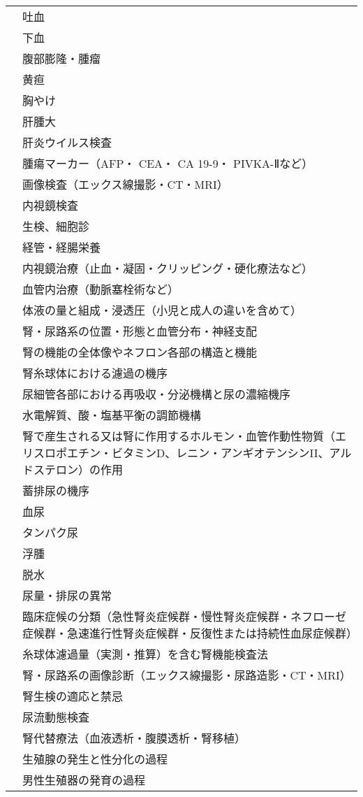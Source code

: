 \begin{xltabular}{\linewidth}{XX}
 & 吐血 \\
 & 下血 \\
 & 腹部膨隆・腫瘤 \\
 & 黄疸 \\
 & 胸やけ \\
 & 肝腫大 \\
 & 肝炎ウイルス検査 \\
 & 腫瘍マーカー（AFP・ CEA・ CA 19-9・ PIVKA-Ⅱなど） \\
 & 画像検査（エックス線撮影・CT・MRI） \\
 & 内視鏡検査 \\
 & 生検、細胞診 \\
 & 経管・経腸栄養 \\
 & 内視鏡治療（止血・凝固・クリッピング・硬化療法など） \\
 & 血管内治療（動脈塞栓術など） \\
 & 体液の量と組成・浸透圧（小児と成人の違いを含めて） \\
 & 腎・尿路系の位置・形態と血管分布・神経支配 \\
 & 腎の機能の全体像やネフロン各部の構造と機能 \\
 & 腎糸球体における濾過の機序 \\
 & 尿細管各部における再吸収・分泌機構と尿の濃縮機序 \\
 & 水電解質、酸・塩基平衡の調節機構 \\
 & 腎で産生される又は腎に作用するホルモン・血管作動性物質（エリスロポエチン・ビタミンD、レニン・アンギオテンシンII、アルドステロン）の作用 \\
 & 蓄排尿の機序 \\
 & 血尿 \\
 & タンパク尿 \\
 & 浮腫 \\
 & 脱水 \\
 & 尿量・排尿の異常 \\
 & 臨床症候の分類（急性腎炎症候群・慢性腎炎症候群・ネフローゼ症候群・急速進行性腎炎症候群・反復性または持続性血尿症候群） \\
 & 糸球体濾過量（実測・推算）を含む腎機能検査法 \\
 & 腎・尿路系の画像診断（エックス線撮影・尿路造影・CT・MRI） \\
 & 腎生検の適応と禁忌 \\
 & 尿流動態検査 \\
 & 腎代替療法（血液透析・腹膜透析・腎移植） \\
 & 生殖腺の発生と性分化の過程 \\
 & 男性生殖器の発育の過程 \\

\end{xltabular}
